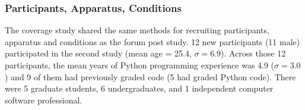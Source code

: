 \documentclass[12pt,twoside]{mitthesis}
\providecommand{\DIFaddbegin}{} %
\providecommand{\DIFaddend}{} %
\providecommand{\DIFdelbegin}{} %
\providecommand{\DIFdelend}{} %
\begin{document}
{{{{{{{{{{\DIFdelbegin %
\DIFdelend \DIFaddbegin \subsubsection{Participants, Apparatus, Conditions}
\DIFaddend 

\DIFdelbegin %

\DIFdelend The coverage study shared the same methods for recruiting participants, apparatus and conditions as the forum post study. 12 new participants (11 male) participated in the second study (mean age = 25.4, $\sigma = 6.9$). Across those 12 participants, the mean years of Python programming experience was 4.9 ($\sigma = 3.0$) and 9 of them had previously graded code (5 had graded Python code). There were 5 graduate students, 6 undergraduates, and 1 independent computer software professional.


}}}}}}}}}}
\end{document}
